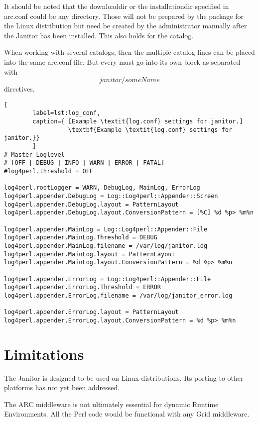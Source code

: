 It should be noted that the downloaddir or the installationdir specified
in arc.conf could be any directory. Those will not be prepared by the
package for the Linux distribution but need be created by the administrator
manually after the Janitor has been installed. This also holds for the
catalog.

When working with several catalogs, then the multiple catalog lines can
be placed into the same arc.conf file. But every must go into its own block
as separated with \[janitor/someName\] directives.

\begin{lstlisting}[
        label=lst:log_conf,
        caption={ [Example \textit{log.conf} settings for janitor.]
                  \textbf{Example \textit{log.conf} settings for janitor.}}
        ]
# Master Loglevel
# [OFF | DEBUG | INFO | WARN | ERROR | FATAL]
#log4perl.threshold = OFF

log4perl.rootLogger = WARN, DebugLog, MainLog, ErrorLog
log4perl.appender.DebugLog = Log::Log4perl::Appender::Screen
log4perl.appender.DebugLog.layout = PatternLayout
log4perl.appender.DebugLog.layout.ConversionPattern = [%C] %d %p> %m%n

log4perl.appender.MainLog = Log::Log4perl::Appender::File
log4perl.appender.MainLog.Threshold = DEBUG
log4perl.appender.MainLog.filename = /var/log/janitor.log
log4perl.appender.MainLog.layout = PatternLayout
log4perl.appender.MainLog.layout.ConversionPattern = %d %p> %m%n

log4perl.appender.ErrorLog = Log::Log4perl::Appender::File
log4perl.appender.ErrorLog.Threshold = ERROR
log4perl.appender.ErrorLog.filename = /var/log/janitor_error.log

log4perl.appender.ErrorLog.layout = PatternLayout
log4perl.appender.ErrorLog.layout.ConversionPattern = %d %p> %m%n
\end{lstlisting}



\section{Limitations}

The Janitor is designed to be used on Linux distributions.
Its porting to other platforms has not yet been addressed.

The ARC middleware is not ultimately essential for dynamic Runtime Environments.
All the Perl code would be functional with any Grid middleware.

